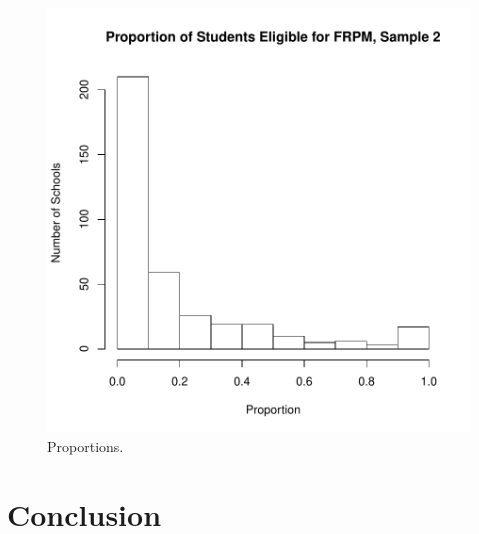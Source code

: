 \documentclass[twocolumn,english]{IEEEtran}
\theoremstyle{plain}
\theoremstyle{plain}
\begin{document}
\begin{figure}[H]
\begin{centering}
\includegraphics{proj3-fig_lunch_props1}
\caption{Proportions.}
\label{fig:Lunch_Hist_One}
\end{centering}
\end{figure}






\section{Conclusion}



%
%
\end{document}
